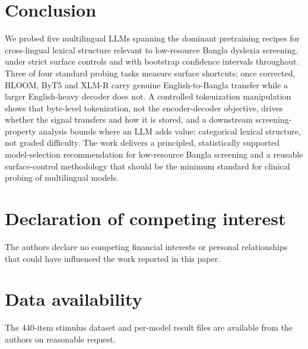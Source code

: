 \documentclass[preprint,12pt]{elsarticle}
\begin{document}
\section{Conclusion}
\label{sec:conclusion}
We probed five multilingual LLMs spanning the dominant pretraining recipes for cross-lingual lexical structure relevant to low-resource Bangla dyslexia screening, under strict surface controls and with bootstrap confidence intervals throughout. Three of four standard probing tasks measure surface shortcuts; once corrected, BLOOM, ByT5 and XLM-R carry genuine English-to-Bangla transfer while a larger English-heavy decoder does not. A controlled tokenization manipulation shows that byte-level tokenization, not the encoder-decoder objective, drives whether the signal transfers and how it is stored, and a downstream screening-property analysis bounds where an LLM adds value: categorical lexical structure, not graded difficulty. The work delivers a principled, statistically supported model-selection recommendation for low-resource Bangla screening and a reusable surface-control methodology that should be the minimum standard for clinical probing of multilingual models.

\section*{Declaration of competing interest}
The authors declare no competing financial interests or personal relationships that could have influenced the work reported in this paper.

\section*{Data availability}
The 440-item stimulus dataset and per-model result files are available from the authors on reasonable request.
\end{document}
